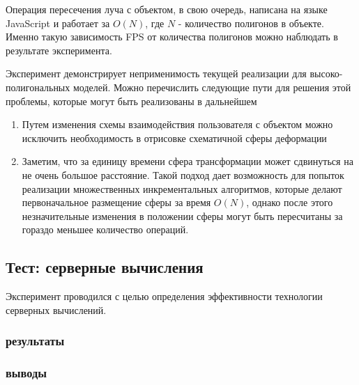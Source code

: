 \documentclass[14pt, a4paper]{extarticle}
\begin{document}
Операция пересечения луча с объектом, в свою очередь, написана на языке
JavaScript и работает за $O(N)$, где $N$ - количество полигонов в объекте.
Именно такую зависимость FPS от количества полигонов можно наблюдать в
результате эксперимента.

Эксперимент демонстрирует неприменимость текущей реализации для
высоко-полигональных моделей. Можно перечислить следующие пути для решения этой
проблемы, которые могут быть реализованы в дальнейшем
\begin{enumerate}
    \item Путем изменения схемы взаимодействия пользователя с объектом можно
    исключить необходимость в отрисовке схематичной сферы деформации
    \item Заметим, что за единицу времени сфера трансформации может сдвинуться
    на не очень большое расстояние. Такой подход дает возможность для попыток
    реализации множественных инкрементальных алгоритмов, которые делают
    первоначальное размещение сферы за время $O(N)$, однако после этого
    незначительные изменения в положении сферы могут быть пересчитаны за гораздо
    меньшее количество операций.
\end{enumerate}

\subsection{Тест: серверные вычисления}

Эксперимент проводился с целью определения эффективности технологии серверных
вычислений.

\subsubsection{результаты}
\begin{center}
\end{center}

\subsubsection{выводы}
\end{document}
